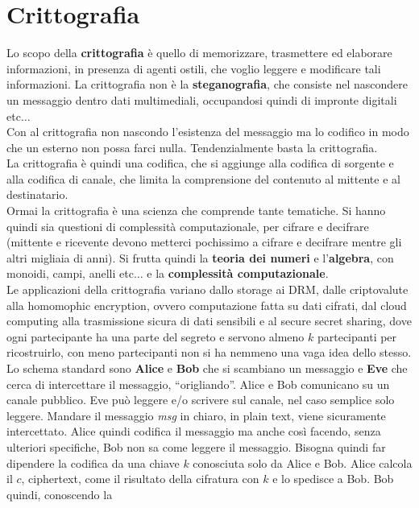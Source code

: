 \documentclass[a4paper,12pt, oneside]{book}
\begin{document}
\chapter{Crittografia}
Lo scopo della \textbf{crittografia} è quello di memorizzare, trasmettere ed
elaborare informazioni, in presenza di agenti ostili, che voglio leggere e
modificare tali informazioni. La crittografia non è la \textbf{steganografia},
che consiste nel nascondere un messaggio dentro dati multimediali, occupandosi
quindi di impronte digitali etc$\ldots$\\
Con al crittografia non nascondo l'esistenza del messaggio ma lo codifico in
modo che un esterno non possa farci nulla. Tendenzialmente basta la
crittografia. \\
La crittografia è quindi una codifica, che si aggiunge alla codifica di
sorgente e alla codifica di canale, che limita la comprensione del contenuto al
mittente e al destinatario.\\
Ormai la crittografia è una scienza che comprende tante tematiche. Si hanno
quindi sia questioni di complessità computazionale, per cifrare e decifrare
(mittente e ricevente devono metterci pochissimo a cifrare e decifrare mentre
gli altri migliaia di anni). Si frutta quindi la \textbf{teoria dei numeri} e
l'\textbf{algebra}, con monoidi, campi, anelli etc$\ldots$ e la
\textbf{complessità computazionale}.\\
Le applicazioni della crittografia variano dallo storage ai DRM, dalle
criptovalute alla homomophic encryption, ovvero computazione fatta su dati
cifrati, dal cloud computing alla trasmissione sicura di dati sensibili e al
secure secret sharing, dove ogni partecipante ha una parte del segreto e servono
almeno $k$ partecipanti per ricostruirlo, con meno partecipanti non si ha
nemmeno una vaga idea dello stesso.\\
Lo schema standard sono \textbf{Alice} e \textbf{Bob} che si scambiano un
messaggio e \textbf{Eve} che cerca di intercettare il messaggio,
``origliando''. Alice e Bob comunicano su un canale pubblico. Eve può leggere
e/o scrivere sul canale, nel caso semplice solo leggere. Mandare il messaggio
\textit{msg} in 
chiaro, in plain text, viene sicuramente intercettato. Alice quindi codifica il
messaggio ma anche così facendo, senza ulteriori specifiche, Bob non sa come
leggere il messaggio. Bisogna quindi far dipendere la codifica da una chiave $k$
conosciuta solo da Alice e Bob. Alice calcola il $c$, ciphertext, come il
risultato della cifratura con $k$ e lo spedisce a Bob. Bob quindi, conoscendo la
\end{document}
